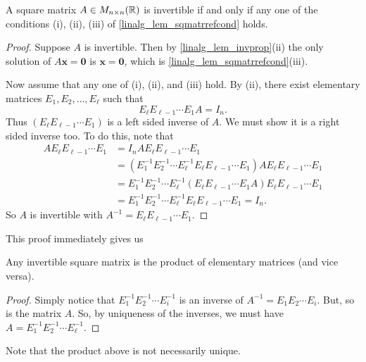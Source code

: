 \documentclass[10pt, a4paper]{article}
\newcommand{\mbf}[1]{\mathbf{#1}}
\begin{document}
\begin{theorem}\label{linalg_thm_fundthmofinvertmatr}
    A square matrix $A \in M_{n \times n}(\mathbb{R})$ is invertible if and only if any one of the conditions (i), (ii), (iii) of \autoref{linalg_lem_sqmatrrefcond} holds.
    \begin{proof}
        Suppose $A$ is invertible.
        Then by \autoref{linalg_lem_invprop}(ii) the only solution of $A\mbf{x} = \mbf{0}$ is $\mbf{x} = \mbf{0}$,
        which is \autoref{linalg_lem_sqmatrrefcond}(iii).

        Now assume that any one of (i), (ii), and (iii) hold.
        By (ii), there exist elementary matrices $E_1, E_2, \dotsc, E_\ell$ such that
        \[
        E_\ell E_{\ell - 1} \dotsi E_1 A = I_n.
        \]
        Thus $(E_\ell E_{\ell - 1} \dotsi E_1)$ is a left sided inverse of $A$.
        We must show it is a right sided inverse too.
        To do this, note that
        \begin{align*}
            AE_\ell E_{\ell - 1} \dotsi E_1 &= I_n A E_\ell E_{\ell - 1} \dotsi E_1 \\
            &= (E_1 ^ {-1} E_2 ^ {-1} \dotsi E_{\ell} ^ {-1}E_\ell E_{\ell - 1} \dotsi E_1)AE_\ell E_{\ell - 1} \dotsi E_1 \\
            &= E_1 ^ {-1} E_2 ^ {-1} \dotsi E_{\ell} ^ {-1}(E_\ell E_{\ell - 1} \dotsi E_1A)E_\ell E_{\ell - 1} \dotsi E_1 \\
            &= E_1 ^ {-1} E_2 ^ {-1} \dotsi E_{\ell} ^ {-1}E_\ell E_{\ell - 1} \dotsi E_1 = I_n.
        \end{align*}
        So $A$ is invertible with $A ^ {-1} = E_\ell E_{\ell - 1} \dotsi E_1$.
    \end{proof}
\end{theorem}
This proof immediately gives us
\begin{corollary}
    Any invertible square matrix is the product of elementary matrices (and vice versa).
    \begin{proof}
        Simply notice that $E_1 ^ {-1}E_2 ^ {-1} \dotsi E_i ^ {-1}$ is an inverse of $A ^ {-1} = E_1E_2 \dotsi E_i$.
        But, so is the matrix $A$.
        So, by uniqueness of the inverses,
        we must have $A = E_1 ^ {-1} E_2 ^ {-1} \dotsi E_\ell ^ {-1}$.
    \end{proof}
\end{corollary}

\begin{remark}
    Note that the product above is not necessarily unique.
\end{remark}
\end{document}
